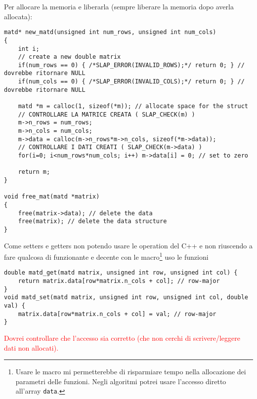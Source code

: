 \documentclass[10pt]{article}
\begin{document}
Per allocare la memoria e liberarla (sempre liberare la memoria dopo averla allocata):
\begin{lstlisting}
matd* new_matd(unsigned int num_rows, unsigned int num_cols)
{
	int i;
	// create a new double matrix
	if(num_rows == 0) { /*SLAP_ERROR(INVALID_ROWS);*/ return 0; } // dovrebbe ritornare NULL
	if(num_cols == 0) { /*SLAP_ERROR(INVALID_COLS);*/ return 0; } // dovrebbe ritornare NULL
	
	matd *m = calloc(1, sizeof(*m)); // allocate space for the struct
	// CONTROLLARE LA MATRICE CREATA ( SLAP_CHECK(m) )
	m->n_rows = num_rows;
	m->n_cols = num_cols;
	m->data = calloc(m->n_rows*m->n_cols, sizeof(*m->data));
	// CONTROLLARE I DATI CREATI ( SLAP_CHECK(m->data) )
	for(i=0; i<num_rows*num_cols; i++) m->data[i] = 0; // set to zero
	
	return m;
}

void free_mat(matd *matrix)
{
	free(matrix->data); // delete the data
	free(matrix); // delete the data structure
}
\end{lstlisting}

Come setters e getters non potendo usare le operation del C++ e non riuscendo a fare qualcosa di funzionante e decente con le macro\footnote{Usare le macro mi permetterebbe di risparmiare tempo nella allocazione dei parametri delle funzioni. Negli algoritmi potrei usare l'accesso diretto all'array \texttt{data}.} uso le funzioni
\begin{lstlisting}
double matd_get(matd matrix, unsigned int row, unsigned int col) {
	return matrix.data[row*matrix.n_cols + col]; // row-major
}
void matd_set(matd matrix, unsigned int row, unsigned int col, double val) {
	matrix.data[row*matrix.n_cols + col] = val; // row-major
}
\end{lstlisting}
\textcolor{red}{Dovrei controllare che l'accesso sia corretto (che non cerchi di scrivere/leggere dati non allocati).}




\newpage

\appendix
\end{document}
